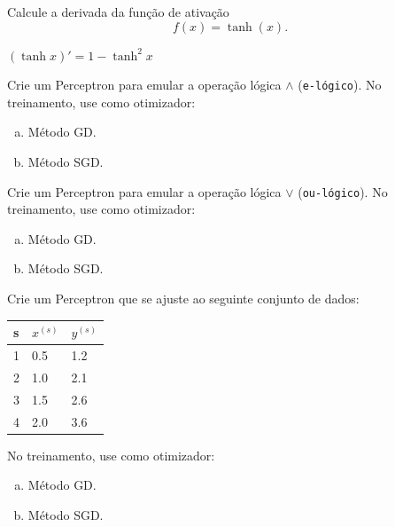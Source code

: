 \begin{exer}
  Calcule a derivada da função de ativação
  \begin{equation}
    f(x) = \tanh(x).
  \end{equation}
\end{exer}
\begin{resp}
  $(\tanh x)' = 1 - \tanh^2 x$
\end{resp}

\begin{exer}
  Crie um Perceptron para emular a operação lógica $\land$ (\texttt{e-lógico}). No treinamento, use como otimizador:
  \begin{enumerate}[a)]
  \item Método GD.
  \item Método SGD.
  \end{enumerate}
\end{exer}

\begin{exer}
  Crie um Perceptron para emular a operação lógica $\lor$ (\texttt{ou-lógico}). No treinamento, use como otimizador:
  \begin{enumerate}[a)]
  \item Método GD.
  \item Método SGD.
  \end{enumerate}
\end{exer}

\begin{exer}\label{cap_perceptron_sec_train:exer:ajuste}
  Crie um Perceptron que se ajuste ao seguinte conjunto de dados:
  \begin{center}
    \begin{tabular}{l|ll}
      s & $x^{(s)}$ & $y^{(s)}$\\\hline
      1 & 0.5 & 1.2\\
      2 & 1.0 & 2.1\\
      3 & 1.5 & 2.6\\
      4 & 2.0 & 3.6\\\hline
    \end{tabular}
  \end{center}
  No treinamento, use como otimizador:
  \begin{enumerate}[a)]
  \item Método GD.
  \item Método SGD.
  \end{enumerate}  
\end{exer}

